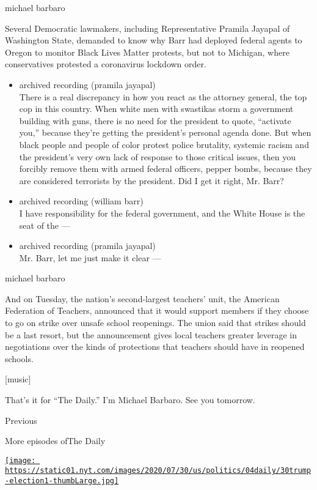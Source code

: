 michael barbaro

Several Democratic lawmakers, including Representative Pramila Jayapal
of Washington State, demanded to know why Barr had deployed federal
agents to Oregon to monitor Black Lives Matter protests, but not to
Michigan, where conservatives protested a coronavirus lockdown order.

\begin{itemize}
\item
  archived recording (pramila jayapal)\\
  There is a real discrepancy in how you react as the attorney general,
  the top cop in this country. When white men with swastikas storm a
  government building with guns, there is no need for the president to
  quote, ``activate you,'' because they're getting the president's
  personal agenda done. But when black people and people of color
  protest police brutality, systemic racism and the president's very own
  lack of response to those critical issues, then you forcibly remove
  them with armed federal officers, pepper bombs, because they are
  considered terrorists by the president. Did I get it right, Mr. Barr?
\item
  archived recording (william barr)\\
  I have responsibility for the federal government, and the White House
  is the seat of the ---
\item
  archived recording (pramila jayapal)\\
  Mr. Barr, let me just make it clear ---
\end{itemize}

michael barbaro

And on Tuesday, the nation's second-largest teachers' unit, the American
Federation of Teachers, announced that it would support members if they
choose to go on strike over unsafe school reopenings. The union said
that strikes should be a last resort, but the announcement gives local
teachers greater leverage in negotiations over the kinds of protections
that teachers should have in reopened schools.

{[}music{]}

That's it for ``The Daily.'' I'm Michael Barbaro. See you tomorrow.

Previous

More episodes ofThe Daily

\href{https://www.nytimes.com/2020/08/04/podcasts/the-daily/mail-in-voting-president-trump.html?action=click\&module=audio-series-bar\&region=header\&pgtype=Article}{\texttt{[image: https://static01.nyt.com/images/2020/07/30/us/politics/04daily/30trump-election1-thumbLarge.jpg]}}

